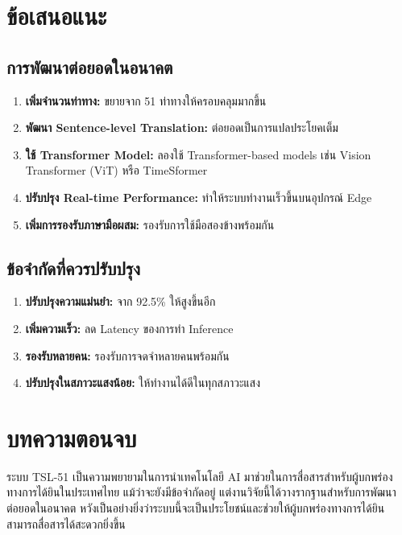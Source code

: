 \documentclass[12pt,a4paper]{report}
\begin{document}
\section{ข้อเสนอแนะ}

\subsection{การพัฒนาต่อยอดในอนาคต}

\begin{enumerate}
    \item \textbf{เพิ่มจำนวนท่าทาง:} ขยายจาก 51 ท่าทางให้ครอบคลุมมากขึ้น
    \item \textbf{พัฒนา Sentence-level Translation:} ต่อยอดเป็นการแปลประโยคเต็ม
    \item \textbf{ใช้ Transformer Model:} ลองใช้ Transformer-based models 
    เช่น Vision Transformer (ViT) หรือ TimeSformer
    \item \textbf{ปรับปรุง Real-time Performance:} ทำให้ระบบทำงานเร็วขึ้นบนอุปกรณ์ Edge
    \item \textbf{เพิ่มการรองรับภาษามือผสม:} รองรับการใช้มือสองข้างพร้อมกัน
\end{enumerate}

\subsection{ข้อจำกัดที่ควรปรับปรุง}

\begin{enumerate}
    \item \textbf{ปรับปรุงความแม่นยำ:} จาก 92.5\% ให้สูงขึ้นอีก
    \item \textbf{เพิ่มความเร็ว:} ลด Latency ของการทำ Inference
    \item \textbf{รองรับหลายคน:} รองรับการจดจำหลายคนพร้อมกัน
    \item \textbf{ปรับปรุงในสภาวะแสงน้อย:} ให้ทำงานได้ดีในทุกสภาวะแสง
\end{enumerate}

\section{บทความตอนจบ}

ระบบ TSL-51 เป็นความพยายามในการนำเทคโนโลยี AI มาช่วยในการสื่อสารสำหรับผู้บกพร่องทางการได้ยินในประเทศไทย 
แม้ว่าจะยังมีข้อจำกัดอยู่ แต่งานวิจัยนี้ได้วางรากฐานสำหรับการพัฒนาต่อยอดในอนาคต 
หวังเป็นอย่างยิ่งว่าระบบนี้จะเป็นประโยชน์และช่วยให้ผู้บกพร่องทางการได้ยินสามารถสื่อสารได้สะดวกยิ่งขึ้น
\end{document}
